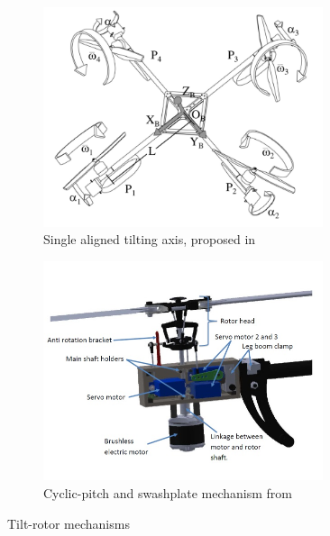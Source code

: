 \begin{figure}[htbp]
\begin{subfigure}{.5\textwidth}
\centering
\includegraphics[width=0.9\textwidth]{figs/tiltpropellercontrol1}
\caption{Single aligned tilting axis, proposed in~\cite{tiltpropellercontrol}}
\label{fig:tiltpropellercontrol1}
\end{subfigure}%
\begin{subfigure}{.5\textwidth}
\centering
\includegraphics[width=0.9\textwidth]{figs/napsholm-mech}
\caption{Cyclic-pitch and swashplate mechanism from \cite{napsholm}}
\label{fig:tiltrotor-napsholm}
\end{subfigure}
\vspace{-4pt}
\caption{Tilt-rotor mechanisms}
\label{fig:tiltprop}
\vspace{-14pt}
\end{figure}
